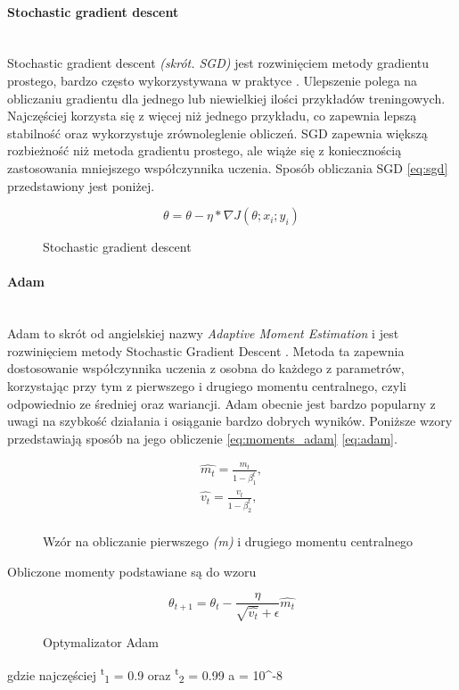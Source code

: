 \paragraph{Stochastic gradient descent} \mbox{}\\
Stochastic gradient descent \textit{(skrót. SGD)} jest rozwinięciem metody gradientu
prostego, bardzo często wykorzystywana w praktyce \cite{OptimizersOverview}.
Ulepszenie polega na obliczaniu gradientu dla jednego lub niewielkiej ilości przykładów
treningowych. Najczęściej korzysta się z więcej niż jednego przykładu, co zapewnia
lepszą stabilność oraz wykorzystuje zrównoleglenie obliczeń. SGD zapewnia większą rozbieżność
niż metoda gradientu prostego, ale wiąże się z koniecznością zastosowania mniejszego
współczynnika uczenia. Sposób obliczania SGD \ref{eq:sgd} przedstawiony jest poniżej.
\begin{figure}[h!]
\renewcommand{\figurename}{Wzór}%
\begin{equation} \label{eq:sgd}
\theta = \theta - \eta * \nabla J(\theta; x_i; y_i)
\end{equation}
\caption{Stochastic gradient descent}
\end{figure}

\paragraph{Adam} \mbox{}\\
Adam to skrót od angielskiej nazwy \textit{Adaptive Moment Estimation} i jest rozwinięciem
metody Stochastic Gradient Descent \cite{AdamOptimizer, OptimizersOverview}.
Metoda ta zapewnia dostosowanie współczynnika uczenia z osobna do każdego z parametrów,
korzystając przy tym z pierwszego i drugiego momentu centralnego, czyli odpowiednio ze
średniej oraz wariancji. Adam obecnie jest bardzo popularny z uwagi na szybkość działania
i osiąganie bardzo dobrych wyników. Poniższe wzory przedstawiają sposób na jego obliczenie \ref{eq:moments_adam} \ref{eq:adam}.
\begin{figure}[h!]
\renewcommand{\figurename}{Wzór}%
\begin{equation} \label{eq:moments_adam}
\begin{align*}
\hat{m_t} = \frac{m_t} {1 - \beta^t_1}, \\
\hat{v_t} = \frac{v_t} {1 - \beta^t_2}, \\
\end{align*}
\end{equation}
\caption{Wzór na obliczanie pierwszego \textit{(m)} i drugiego  momentu centralnego}
\end{figure}
Obliczone momenty podstawiane są do wzoru
\begin{figure}[h!]
\renewcommand{\figurename}{Wzór}%
\begin{equation} \label{eq:adam}
\theta_{t+1} = \theta_t - \frac {\eta} {\sqrt{\hat{v_t}} + \epsilon} \hat{m_t}
\end{equation}
\caption{Optymalizator Adam}
\end{figure}
gdzie najczęściej \textbeta \textsuperscript{t}\textsubscript{1} = 0.9 oraz
\textbeta \textsuperscript{t}\textsubscript{2} = 0.99 a \straightepsilon = 10^{-8}\\

